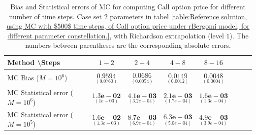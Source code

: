 \documentclass[11pt]{article}
\begin{document}
\begin{table}[h!]
	\centering
	\begin{tabular}{l*{6}{c}r}
		Method \textbackslash  Steps            & $1-2$ & $2-4$ & $4-8$ & $8-16$  \\
		\hline
		MC Bias ($M=10^6$)  &$\underset{( 0.0760)}{\mathbf{0.9594}}$  & $\underset{( 0.0054)}{\mathbf{0.0686}}$  & $\underset{(   0.0012)}{\mathbf{0.0149}}$  & $\underset{(  0.0004)}{\mathbf{0.0048}}$ \\	
		
		MC Statistical error ($M=10^6$)   & $\underset{( 1e-03)}{\mathbf{1.3e-02}}$  & $\underset{(   3.2e-04)}{\mathbf{4.1e-03}}$  & $\underset{(  1.7e-04)}{\mathbf{2.1e-03}}$ & $\underset{(  1.3e-04)}{\mathbf{1.6e-03}}$ \\	
		
		
		
 
			
			MC Statistical error ($M=10^5$)  & $\underset{( 1.3e-03)}{\mathbf{1.6e-02}}$  & $\underset{(   6.9e-04)}{\mathbf{8.7e-03}}$  & $\underset{(  5.0e-04)}{\mathbf{6.3e-03}}$ & $\underset{(  3.9e-04)}{\mathbf{4.9e-03}}$ \\
		\hline
	\end{tabular}
	\caption{Bias and Statistical errors of MC   for computing Call option price  for different number of time steps. Case set $2$ parameters in tabel \ref{table:Reference solution, using MC with $500$ time steps, of Call option price under rBergomi model, for different parameter constellation.}, with Richardson extrapolation (level $1$). The numbers between parentheses are the corresponding absolute errors.}
	\label{Bias and Statistical errors of MC ($M=10^6$)  for computing Call option price  for different number of time steps. Case set $2$ parameters, with Richardson extrapolation (level1). The numbers between parentheses are the corresponding absolute errors.}
\end{table}
\end{document}
